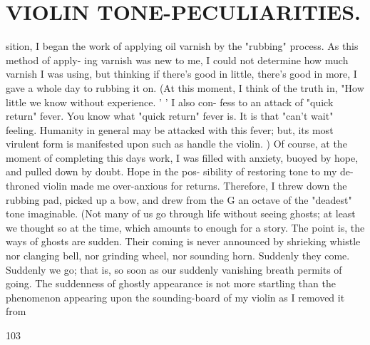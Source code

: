 \section{VIOLIN TONE-PECULIARITIES.}

sition, I began the work of applying oil varnish by the "rubbing" process. As this method of apply- ing varnish was new to me, I could not determine how much varnish I was using, but thinking if there's good in little, there's good in more, I gave a whole day to rubbing it on. (At this moment, I think of the truth in, "How little we know without experience. ' ' I also con- fess to an attack of "quick return" fever. You know what "quick return" fever is. It is that "can't wait" feeling. Humanity in general may be attacked with this fever; but, its most virulent form is manifested upon such as handle the violin. ) Of course, at the moment of completing this days work, I was filled with anxiety, buoyed by hope, and pulled down by doubt. Hope in the pos- sibility of restoring tone to my de-throned violin made me over-anxious for returns. Therefore, I threw down the rubbing pad, picked up a bow, and drew from the G an octave of the "deadest" tone imaginable. (Not many of us go through life without seeing ghosts; at least we thought so at the time, which amounts to enough for a story. The point is, the ways of ghosts are sudden. Their coming is never announced by shrieking whistle nor clanging bell, nor grinding wheel, nor sounding horn. Suddenly they come. Suddenly we go; that is, so soon as our suddenly vanishing breath permits of going. The suddenness of ghostly appearance is not more startling than the phenomenon appearing upon the sounding-board of my violin as I removed it from

103
